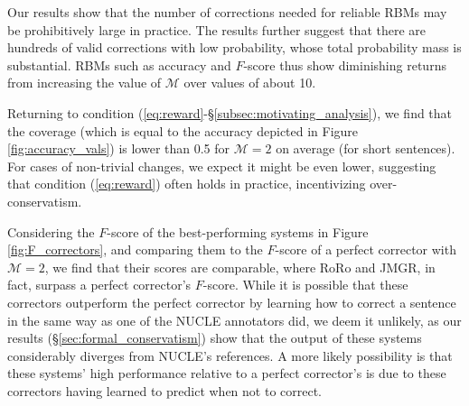 \documentclass[letterpaper, 11pt]{article}
\begin{document}
Our results show that the number of corrections needed for reliable RBMs may be prohibitively large in practice.
The results further suggest that there are hundreds of valid corrections with low probability, whose total probability mass is substantial. RBMs such as accuracy and $F$-score thus show diminishing returns from increasing the value of $\mathcal{M}$ over values of about 10.
%
%
%

Returning to condition (\ref{eq:reward}-\S \ref{subsec:motivating_analysis}), we find that the coverage (which is equal to the accuracy depicted in Figure \ref{fig:accuracy_vals}) is lower than 0.5 for $\mathcal{M}=2$ on average (for short sentences). For cases of non-trivial changes, we expect it might be even lower, suggesting that condition (\ref{eq:reward}) often holds in practice, incentivizing over-conservatism.

Considering the $F$-score of the best-performing systems in Figure \ref{fig:F_correctors}, and comparing them to the $F$-score of a perfect corrector with $\mathcal{M}=2$, we find that their scores are comparable, where RoRo and JMGR, in fact, surpass a perfect corrector's $F$-score.
While it is possible that these correctors outperform the perfect corrector by learning how to correct a sentence in the same way as one of the NUCLE annotators did, we deem it unlikely, as our results (\S\ref{sec:formal_conservatism}) show that the output of these systems considerably diverges from NUCLE's references.
A more likely possibility is that these systems' high performance relative to a perfect corrector's is due to these correctors having learned to predict when not to correct.
\end{document}

